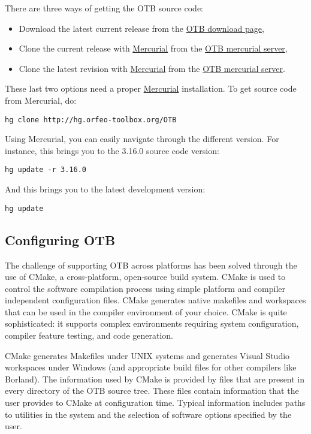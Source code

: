 There are three ways of getting the OTB source code:
\begin{itemize}
\item Download the latest current release from the \href{http://sourceforge.net/projects/orfeo-toolbox/}{OTB download page},
\item Clone the current release with \href{http://mercurial.selenic.com}{Mercurial} from the \href{http://hg.orfeo-toolbox.org/OTB}{OTB mercurial server},
\item Clone the latest revision with \href{http://mercurial.selenic.com}{Mercurial} from the \href{http://hg.orfeo-toolbox.org/OTB}{OTB mercurial server}.
\end{itemize}

These last two options need a proper \href{http://mercurial.selenic.com}{Mercurial} installation. To get source code from Mercurial, do:
\begin{verbatim}
hg clone http://hg.orfeo-toolbox.org/OTB
\end{verbatim}

Using Mercurial, you can easily navigate through the different version. For instance, this brings you to the 3.16.0 source code version:
\begin{verbatim}
hg update -r 3.16.0
\end{verbatim}

And this brings you to the latest development version:
\begin{verbatim}
hg update
\end{verbatim}


\subsection{Configuring OTB}
\label{sec:ConfiguringOTB}


The challenge of supporting OTB across platforms has been solved through the use of CMake, a cross-platform, open-source build system. CMake is used to control the software compilation process using simple platform and compiler independent configuration files.  CMake generates native makefiles and workspaces that can be used in the compiler environment of your choice. CMake is quite sophisticated: it supports complex environments requiring system configuration, compiler feature testing, and code generation.

CMake generates Makefiles under UNIX systems and generates Visual Studio workspaces under Windows (and appropriate build files for other compilers like Borland). The information used by CMake is provided by  files that are present in every directory of the OTB source tree. These files contain information that the user provides to CMake at configuration time. Typical information includes paths to utilities in the system and the selection of software options specified by the user.


